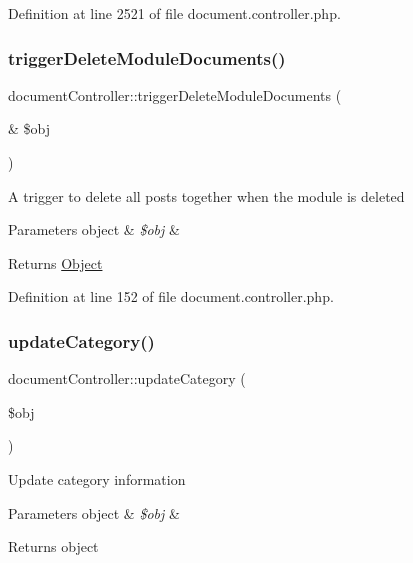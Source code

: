 Definition at line 2521 of file document.\+controller.\+php.

\hypertarget{classdocumentController_a6b5c3aae5cb5a4fd51350a597963d73a}{}\label{classdocumentController_a6b5c3aae5cb5a4fd51350a597963d73a} 
\subsubsection{\texorpdfstring{trigger\+Delete\+Module\+Documents()}{triggerDeleteModuleDocuments()}}
{\footnotesize\ttfamily document\+Controller\+::trigger\+Delete\+Module\+Documents (\begin{DoxyParamCaption}\item[{\&}]{\$obj }\end{DoxyParamCaption})}

A trigger to delete all posts together when the module is deleted 
\begin{DoxyParams}[1]{Parameters}
object & {\em \$obj} & \\
\hline
\end{DoxyParams}
\begin{DoxyReturn}{Returns}
\hyperlink{classObject}{Object} 
\end{DoxyReturn}


Definition at line 152 of file document.\+controller.\+php.

\hypertarget{classdocumentController_a7a4e53cda0765a416280e403b6193b0a}{}\label{classdocumentController_a7a4e53cda0765a416280e403b6193b0a} 
\subsubsection{\texorpdfstring{update\+Category()}{updateCategory()}}
{\footnotesize\ttfamily document\+Controller\+::update\+Category (\begin{DoxyParamCaption}\item[{}]{\$obj }\end{DoxyParamCaption})}

Update category information 
\begin{DoxyParams}[1]{Parameters}
object & {\em \$obj} & \\
\hline
\end{DoxyParams}
\begin{DoxyReturn}{Returns}
object 
\end{DoxyReturn}


